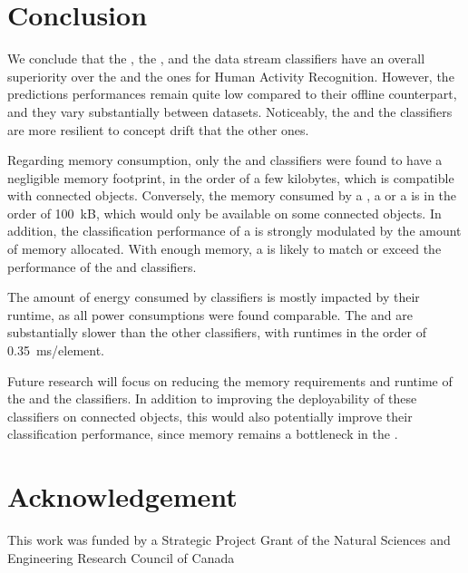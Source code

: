 \section{Conclusion}

We conclude that the \hoeffdingtree, the \mondrianforest, and the
\naivebayes data stream classifiers have an overall superiority over the
\FNN and the \mcnns ones for Human Activity Recognition.  However, the
predictions performances remain quite low compared to their offline
counterpart, and they vary substantially between datasets. Noticeably, the
\hoeffdingtree and the \mcnns classifiers are more resilient to concept drift that the
other ones.

Regarding memory consumption, only the \mcnns and \naivebayes classifiers
were found to have a negligible memory footprint, in the order of a few
kilobytes, which is compatible with connected objects. Conversely, the
memory consumed by a \mondrianforest, a \FNN or a \hoeffdingtree is in the
order of 100~kB, which would only be available on some connected objects.
In addition, the classification performance of a \mondrianforest is
strongly modulated by the amount of memory allocated. With enough memory, a
\mondrianforest is likely to match or exceed the performance of the
\hoeffdingtree and \naivebayes classifiers.

The amount of energy consumed by classifiers is mostly impacted by their
runtime, as all power consumptions were found comparable. The
\hoeffdingtree and \mondrianforest are substantially slower than the other
classifiers, with runtimes in the order of 0.35~ms/element. 

Future research will focus on reducing the memory requirements and runtime
of the \hoeffdingtree and the \mondrianforest classifiers. In addition to
improving the deployability of these classifiers on connected objects, this
would also potentially improve their classification performance, since
memory remains a bottleneck in the \mondrianforest.

\section*{Acknowledgement}
This work was funded by a Strategic Project Grant of
the Natural Sciences and Engineering Research Council of
Canada
